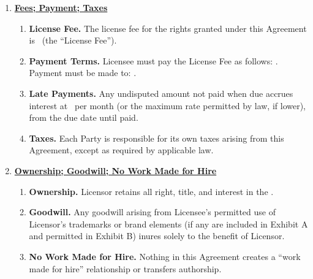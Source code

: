 \begin{enumerate}[leftmargin=*, label=\arabic*.]
\begin{enumerate}[leftmargin=*, label=\arabic{enumi}.\arabic*]
		\item \textbf{Approval Rights.} If Exhibit B states that Licensor approval is required
		for certain uses (e.g., final cut, context, or placement), Licensee must obtain
		Licensor's written approval before publishing or distributing the applicable \project
		materials.
	\end{enumerate}

	\item \textbf{\uline{Fees; Payment; Taxes}}

	\begin{enumerate}[leftmargin=*, label=\arabic{enumi}.\arabic*]
		\item \textbf{License Fee.} The license fee for the rights granted under this Agreement
		is \licenseFee\ (the ``License Fee'').

		\item \textbf{Payment Terms.} Licensee must pay the License Fee as follows:
		\paymentTerms. Payment must be made to: \paymentTo.

		\item \textbf{Late Payments.} Any undisputed amount not paid when due accrues interest at
		\lateInterest\ per month (or the maximum rate permitted by law, if lower), from the due
		date until paid.

		\item \textbf{Taxes.} Each Party is responsible for its own taxes arising from this
		Agreement, except as required by applicable law.
	\end{enumerate}

	\item \textbf{\uline{Ownership; Goodwill; No Work Made for Hire}}

	\begin{enumerate}[leftmargin=*, label=\arabic{enumi}.\arabic*]
		\item \textbf{Ownership.} Licensor retains all right, title, and interest in the
		\licensedIP.

		\item \textbf{Goodwill.} Any goodwill arising from Licensee's permitted use of Licensor's
		trademarks or brand elements (if any are included in Exhibit A and permitted in Exhibit
		B) inures solely to the benefit of Licensor.

		\item \textbf{No Work Made for Hire.} Nothing in this Agreement creates a ``work made for
		hire'' relationship or transfers authorship.
	\end{enumerate}


\end{enumerate}
